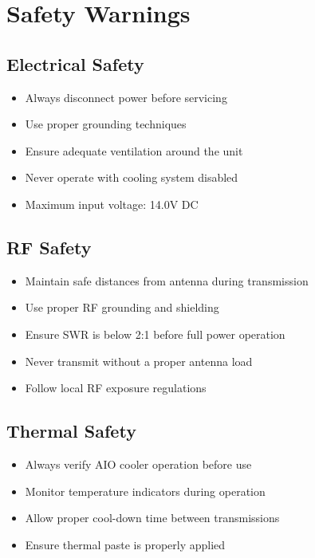 \documentclass[11pt,a4paper]{article}
\begin{document}
\section{Safety Warnings}

\begin{center}
\end{center}

\subsection{Electrical Safety}
\begin{itemize}
    \item Always disconnect power before servicing
    \item Use proper grounding techniques
    \item Ensure adequate ventilation around the unit
    \item Never operate with cooling system disabled
    \item Maximum input voltage: 14.0V DC
\end{itemize}

\subsection{RF Safety}
\begin{itemize}
    \item Maintain safe distances from antenna during transmission
    \item Use proper RF grounding and shielding
    \item Ensure SWR is below 2:1 before full power operation
    \item Never transmit without a proper antenna load
    \item Follow local RF exposure regulations
\end{itemize}

\subsection{Thermal Safety}
\begin{itemize}
    \item Always verify AIO cooler operation before use
    \item Monitor temperature indicators during operation
    \item Allow proper cool-down time between transmissions
    \item Ensure thermal paste is properly applied
\end{itemize}
\end{document}
